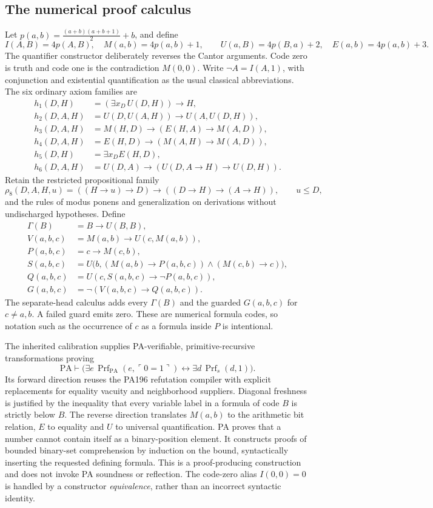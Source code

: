 \documentclass[11pt,letterpaper]{article}
\newcommand{\PA}{\mathrm{PA}}
\newcommand{\Prf}{\operatorname{Prf}}
\begin{document}
\subsection{The numerical proof calculus}
Let $p(a,b)=\frac{(a+b)(a+b+1)}2+b$, and define
\[
 I(A,B)=4p(A,B),\quad M(a,b)=4p(a,b)+1,
\qquad U(a,B)=4p(B,a)+2,\quad E(a,b)=4p(a,b)+3.
\]
The quantifier constructor deliberately reverses the Cantor arguments.
Code zero is truth and code one is the contradiction $M(0,0)$. Write
$\neg A=I(A,1)$, with conjunction and existential quantification as the
usual classical abbreviations. The six ordinary axiom families are
\begin{align*}
 h_1(D,H)&=(\exists x_D\,U(D,H))\to H,\\
 h_2(D,A,H)&=U(D,U(A,H))\to U(A,U(D,H)),\\
 h_3(D,A,H)&=M(H,D)\to(E(H,A)\to M(A,D)),\\
 h_4(D,A,H)&=E(H,D)\to(M(A,H)\to M(A,D)),\\
 h_5(D,H)&=\exists x_D E(H,D),\\
 h_6(D,A,H)&=U(D,A)\to(U(D,A\to H)\to U(D,H)).
\end{align*}
Retain the restricted propositional family
\[
 \rho_8(D,A,H,u)=((H\to u)\to D)\to
                   ((D\to H)\to(A\to H)),\qquad u\le D,
\]
and the rules of modus ponens and generalization on derivations without
undischarged hypotheses. Define
\begin{align*}
 \Gamma(B)&=B\to U(B,B),\\
 V(a,b,c)&=M(a,b)\to U(c,M(a,b)),\\
 P(a,b,c)&=c\to M(c,b),\\
 S(a,b,c)&=U\bigl(b,(M(a,b)\to P(a,b,c))\wedge(M(c,b)\to c)\bigr),\\
 Q(a,b,c)&=U(c,S(a,b,c)\to\neg P(a,b,c)),\\
 G(a,b,c)&=\neg(V(a,b,c)\to Q(a,b,c)).
\end{align*}
The separate-head calculus adds every $\Gamma(B)$ and the guarded
$G(a,b,c)$ for $c\ne a,b$. A failed guard emits zero. These are numerical
formula codes, so notation such as the occurrence of $c$ as a formula
inside $P$ is intentional.

The inherited calibration supplies PA-verifiable, primitive-recursive
transformations proving
\[
 \PA\vdash
 \bigl(\exists e\,\Prf_{\PA}(e,\ulcorner0=1\urcorner)
 \leftrightarrow\exists d\,\Prf_s(d,1)\bigr).             \tag{C}
\]
Its forward direction reuses the PA196 refutation compiler with explicit
replacements for equality vacuity and neighborhood suppliers. Diagonal
freshness is justified by the inequality that every variable label in a
formula of code $B$ is strictly below $B$. The reverse direction translates
$M(a,b)$ to the arithmetic bit relation, $E$ to equality and $U$ to
universal quantification. PA proves that a number cannot contain itself
as a binary-position element. It constructs proofs of bounded binary-set
comprehension by induction on the bound, syntactically inserting the
requested defining formula. This is a proof-producing construction and
does not invoke PA soundness or reflection. The code-zero alias
$I(0,0)=0$ is handled by a constructor \emph{equivalence}, rather than an
incorrect syntactic identity.
\end{document}
